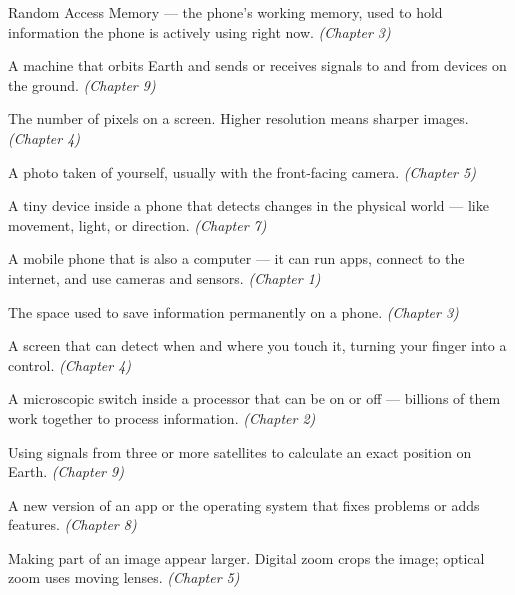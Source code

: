 \begin{tcolorbox}
\begin{description}[labelwidth=4cm, leftmargin=4.2cm, style=nextline, itemsep=0.45\baselineskip]
\item[\glossterm{RAM}]
Random Access Memory — the phone's working memory, used to hold information the phone is
actively using right now.
\emph{(Chapter 3)}

\item[\glossterm{Satellite}]
A machine that orbits Earth and sends or receives signals to and from devices on the ground.
\emph{(Chapter 9)}

\item[\glossterm{Screen resolution}]
The number of pixels on a screen. Higher resolution means sharper images.
\emph{(Chapter 4)}

\item[\glossterm{Selfie}]
A photo taken of yourself, usually with the front-facing camera.
\emph{(Chapter 5)}

\item[\glossterm{Sensor}]
A tiny device inside a phone that detects changes in the physical world — like movement, light, or direction.
\emph{(Chapter 7)}

\item[\glossterm{Smartphone}]
A mobile phone that is also a computer — it can run apps, connect to the internet, and use cameras and sensors.
\emph{(Chapter 1)}

\item[\glossterm{Storage}]
The space used to save information permanently on a phone.
\emph{(Chapter 3)}

\item[\glossterm{Touchscreen}]
A screen that can detect when and where you touch it, turning your finger into a control.
\emph{(Chapter 4)}

\item[\glossterm{Transistor}]
A microscopic switch inside a processor that can be on or off — billions of them work together to process information.
\emph{(Chapter 2)}

\item[\glossterm{Triangulation}]
Using signals from three or more satellites to calculate an exact position on Earth.
\emph{(Chapter 9)}

\item[\glossterm{Update}]
A new version of an app or the operating system that fixes problems or adds features.
\emph{(Chapter 8)}

\item[\glossterm{Zoom}]
Making part of an image appear larger. Digital zoom crops the image; optical zoom uses moving lenses.
\emph{(Chapter 5)}

\end{description}
\end{tcolorbox}
